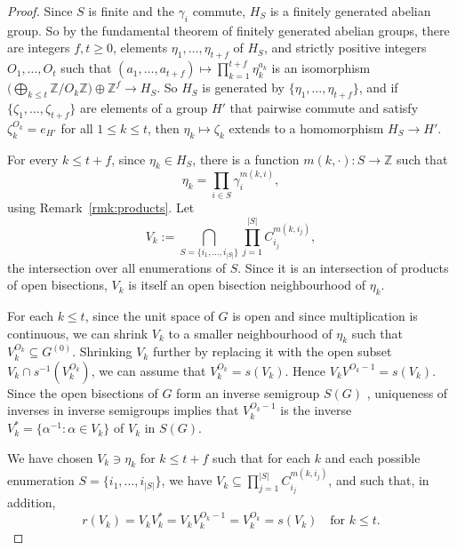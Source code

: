 \documentclass[a4paper, 12pt]{amsart}
\theoremstyle{plain}
\theoremstyle{definition}
\theoremstyle{remark}
\numberwithin{equation}{section}
\begin{document}
\begin{proof}
Since $S$ is finite and the $\gamma_i$ commute, $H_S$ is a finitely
generated abelian group. So by the fundamental theorem of finitely generated
abelian groups, there are integers $f, t \ge 0$, elements $\eta_1, \dots,
\eta_{t+f}$ of $H_S$, and strictly positive integers $O_1, \dots, O_t$ such
that $(a_1, \dots, a_{t+f}) \mapsto \prod^{t+f}_{k=1} \eta_k^{a_k}$ is an
isomorphism $\big(\bigoplus_{k \le t} \mathbb{Z}/O_k\mathbb{Z}\big) \oplus
\mathbb{Z}^f \to H_S$. So $H_S$ is generated by $\{\eta_1, \dots,
\eta_{t+f}\}$, and if $\{\zeta_1, \dots, \zeta_{t+f}\}$ are elements of a group
$H'$ that pairwise commute and satisfy $\zeta_k^{O_k} = e_{H'}$ for all $1 \le
k \le t$, then $\eta_k \mapsto \zeta_k$ extends to a homomorphism $H_S \to H'$.

For every $k \le t+f$, since $\eta_k \in H_S$, there is a function $m(k, \cdot) \colon S \to \mathbb{Z}$ such that
\[
    \eta_k = \prod_{i \in S} \gamma_i^{m(k,i)},
\]
using Remark~\ref{rmk:products}. Let
\begin{equation}\label{eq:all intersections}
V_k := \bigcap_{S = \{i_1, \dots, i_{|S|}\}} \prod_{j = 1}^{|S|} C_{i_j}^{m(k,i_j)},
\end{equation}
the intersection over all enumerations of $S$. Since it is an intersection of products of open bisections, $V_k$ is itself an open bisection
neighbourhood of $\eta_k$.

For each $k \le t$, since the unit space of $G$ is open and since
multiplication is continuous, we can shrink $V_k$ to a smaller neighbourhood
of $\eta_k$ such that $V_k^{O_k} \subseteq G^{(0)}$. Shrinking $V_k$ further
by replacing it with the open subset $V_k \cap s^{-1}(V_k^{O_k})$, we can
assume that $V_k^{O_k} = s(V_k)$. Hence $V_k V^{O_k - 1} = s(V_k)$. Since the
open bisections of $G$ form an inverse semigroup $S(G)$
\cite[Proposition~2.2.4]{Paterson}, uniqueness of inverses in inverse
semigroups \cite[page~21]{Paterson} implies that
$V_k^{O_k - 1}$ is the inverse $V_k^* =
\{\alpha^{-1} : \alpha \in V_k\}$
of $V_k$ in $S(G)$.

We have chosen $V_k \owns \eta_k$ for $k \le t+f$ such that for each $k$
and each possible enumeration $S = \{i_1, \dots, i_{|S|}\}$, we have $V_k
\subseteq \prod_{j = 1}^{|S|} C_{i_j}^{m(k,i_j)}$, and such that, in
addition,
\begin{equation}\label{eq:r,s on torsion}
r(V_k) = V_k V_k^* = V_k V_k^{O_k - 1} = V_k^{O_k} = s(V_k)
\quad\text{for }k \le t.
\end{equation}


\end{proof}
\end{document}
